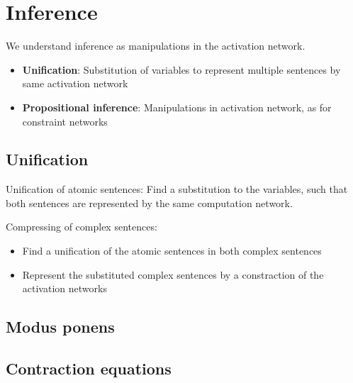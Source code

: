 \section{Inference}


We understand inference as manipulations in the activation network.
\begin{itemize}
    \item {\bf Unification}: Substitution of variables to represent multiple sentences by same activation network
    \item {\bf Propositional inference}: Manipulations in activation network, as for constraint networks
\end{itemize}

\subsection{Unification}

Unification of atomic sentences: Find a substitution to the variables, such that both sentences are represented by the same computation network.

Compressing of complex sentences:
\begin{itemize}
    \item Find a unification of the atomic sentences in both complex sentences
    \item Represent the substituted complex sentences by a constraction of the activation networks
\end{itemize}

\subsection{Modus ponens}



\subsection{Contraction equations}

